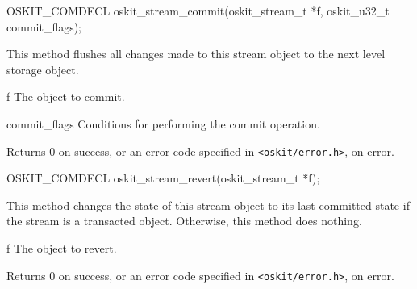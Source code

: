 \begin{apisyn}

	\funcproto OSKIT_COMDECL
	oskit_stream_commit(oskit_stream_t *f, 
		           oskit_u32_t commit_flags);
\end{apisyn}
\begin{apidesc}
	This method flushes all changes made to
	this stream object to the next level storage
	object.  
\end{apidesc}
\begin{apiparm}
	\item[f]
		The object to commit.
	\item[commit_flags]
		Conditions for performing the commit operation.
\end{apiparm}
\begin{apiret}
	Returns 0 on success, or an error code specified in
	{\tt <oskit/error.h>}, on error.
\end{apiret}


\begin{apisyn}

	\funcproto OSKIT_COMDECL
	oskit_stream_revert(oskit_stream_t *f); 
\end{apisyn}
\begin{apidesc}
	This method changes the state of this stream object
	to its last committed state if the stream is a
	transacted object.  Otherwise, this method
	does nothing.
\end{apidesc}
\begin{apiparm}
	\item[f]
		The object to revert.
\end{apiparm}
\begin{apiret}
	Returns 0 on success, or an error code specified in
	{\tt <oskit/error.h>}, on error.
\end{apiret}


